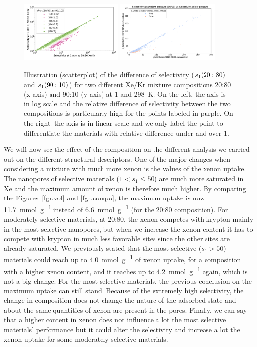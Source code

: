 \documentclass[main.tex]{subfiles}
\begin{document}
\begin{figure}[ht]
  \centering
    \includegraphics[width=0.45\textwidth]{figures/2-thermo/s_2080_vs_s_9010_overview_log.jpg}
    \includegraphics[width=0.45\textwidth]{figures/2-thermo/s_2080_vs_s_9010_overview.jpg}
    \caption{Illustration (scatterplot) of the difference of selectivity ($s_{\text{1}}(20:80)$ and $s_{\text{1}}(90:10)$) for two different Xe/Kr mixture compositions 20:80 (x-axis) and 90:10 (y-axis) at \SI{1}{\atm} and \SI{298}{\kelvin}. On the left, the axis is in log scale and the relative difference of selectivity between the two compositions is particularly high for the points labeled in purple. On the right, the axis is in linear scale and we only label the point to differentiate the materials with relative difference under and over $1$.}
    \label{fgr:SI:overview_2080_9010}
  \end{figure}

We will now see the effect of the composition on the different analysis we carried out on the different structural descriptors. One of the major changes when considering a mixture with much more xenon is the values of the xenon uptake. The nanopores of selective materials ($1<s_1\leq 50$) are much more saturated in Xe and the maximum amount of xenon is therefore much higher. By comparing the Figures~\ref{fgr:vol} and \ref{fgr:compo}, the maximum uptake is now \SI{11.7}{\milli\mole\per\gram} instead of \SI{6.6}{\milli\mole\per\gram} (for the 20:80 composition). For moderately selective materials, at 20:80, the xenon competes with krypton mainly in the most selective nanopores, but when we increase the xenon content it has to compete with krypton in much less favorable sites since the other sites are already saturated. We previously stated that the most selective ($s_1>50$) materials could reach up to \SI{4.0}{\milli\mole\per\gram} of xenon uptake, for a composition with a higher xenon content, and it reaches up to \SI{4.2}{\milli\mole\per\gram} again, which is not a big change. For the most selective materials, the previous conclusion on the maximum uptake can still stand. Because of the extremely high selectivity, the change in composition does not change the nature of the adsorbed state and about the same quantities of xenon are present in the pores. Finally, we can say that a higher content in xenon does not influence a lot the most selective materials' performance but it could alter the selectivity and increase a lot the xenon uptake for some moderately selective materials.
\end{document}
